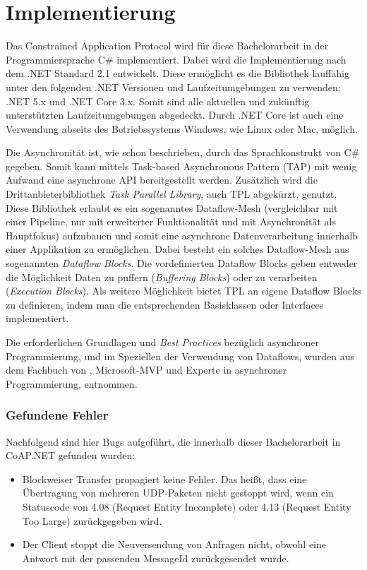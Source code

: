 \section{Implementierung}
\label{sec:implementierung}

Das Constrained Application Protocol wird für diese Bachelorarbeit in der Programmiersprache C\# implementiert. Dabei wird die Implementierung nach dem .NET Standard 2.1 entwickelt. Diese ermöglicht es die Bibliothek lauffähig unter den folgenden .NET Versionen und Laufzeitumgebungen zu verwenden: .NET 5.x und .NET Core 3.x. Somit sind alle aktuellen und zukünftig unterstützten Laufzeitumgebungen abgedeckt. Durch .NET Core ist auch eine Verwendung abseits des Betriebssystems Windows, wie Linux oder Mac, möglich.

Die Asynchronität ist, wie schon beschrieben, durch das Sprachkonstrukt von C\# gegeben. Somit kann mittels Task-based Asynchronous Pattern (TAP) mit wenig Aufwand eine asynchrone API bereitgestellt werden. Zusätzlich wird die Drittanbieterbibliothek \textit{Task Parallel Library}, auch TPL abgekürzt, genutzt. Diese Bibliothek erlaubt es ein sogenanntes Dataflow-Mesh (vergleichbar mit einer Pipeline, nur mit erweiterter Funktionalität und mit Asynchronität als Hauptfokus) aufzubauen und somit eine asynchrone Datenverarbeitung innerhalb einer Applikation zu ermöglichen. Dabei besteht ein solches Dataflow-Mesh aus sogenannten \textit{Dataflow Blocks}. Die vordefinierten Dataflow Blocks geben entweder die Möglichkeit Daten zu puffern (\textit{Buffering Blocks}) oder zu verarbeiten (\textit{Execution Blocks}). Als weitere Möglichkeit bietet TPL an eigene Dataflow Blocks zu definieren, indem man die entsprechenden Basisklassen oder Interfaces implementiert.

Die erforderlichen Grundlagen und \textit{Best Practices} bezüglich asynchroner Programmierung, und im Speziellen der Verwendung von Dataflows, wurden aus dem Fachbuch  von \citeauthor{cleary2019concurrency}, Microsoft-MVP und Experte in asynchroner Programmierung, entnommen.

\subsubsection{Gefundene Fehler}
\label{subsubsec:gefundende-fehler}

Nachfolgend sind hier Bugs aufgeführt, die innerhalb dieser Bachelorarbeit in CoAP.NET gefunden wurden:
\begin{itemize}
    \item Blockweiser Transfer propagiert keine Fehler. Das heißt, dass eine Übertragung von mehreren UDP-Paketen nicht gestoppt wird, wenn ein Statuscode von 4.08 (Request Entity Incomplete) oder 4.13 (Request Entity Too Large) zurückgegeben wird.
    \item Der Client stoppt die Neuversendung von Anfragen nicht, obwohl eine Antwort mit der passenden MessageId zurückgesendet wurde.
\end{itemize}

